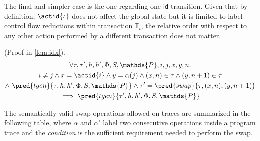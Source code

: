 The final and simpler case is the one regarding one $\mathsf{id}$ transition. Given that by definition, $\actid{\iota}$ does not affect the global state but it is limited to label control flow reductions within transaction $\mathds{T}_\iota$, the relative order with respect to any other action performed by a different transaction does not matter.
\begin{lem}
	(Proof in \ref{lem:idx}).
	\begin{gather*}
		\forall \tau, \tau', h, h', \Phi, S, \mathds{P}, i, j, x, y, n \ldotp \\
			i \neq j \land x = \actid{i} \land y = \alpha(j) \land (x, n) \in \tau \land (y, n+1) \in \tau \\ \land\ \pred{tgen}{\tau, h, h', \Phi, S, \mathds{P}} \land \tau' = \pred{swap}{\tau, (x, n), (y, n+1)}
			\\	 
		 \implies \pred{tgen}{\tau', h, h', \Phi, S, \mathds{P}}
	\end{gather*}
\end{lem}

The semantically valid swap operations allowed on traces are summarized in the following table, where $\alpha$ and $\alpha'$ label two consecutive operations inside a program trace and the \textit{condition} is the sufficient requirement needed to perform the swap.

